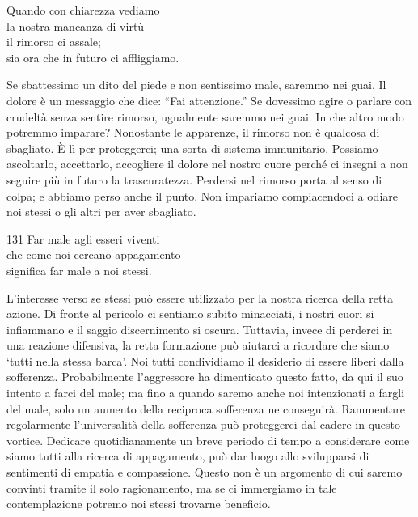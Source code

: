 \begin{dhpVerse}{15}
\label{dhp-15}
Quando con chiarezza vediamo\\
la nostra mancanza di virtù\\
il rimorso ci assale;\\
sia ora che in futuro ci affliggiamo.
\end{dhpVerse}

\begin{dhpRefl}
  Se sbattessimo un dito del piede e non sentissimo male, saremmo nei guai. Il
  dolore è un messaggio che dice: ``Fai attenzione.'' Se dovessimo agire o
  parlare con crudeltà senza sentire rimorso, ugualmente saremmo nei guai. In
  che altro modo potremmo imparare? Nonostante le apparenze, il rimorso non è
  qualcosa di sbagliato. È lì per proteggerci; una sorta di sistema immunitario.
  Possiamo ascoltarlo, accettarlo, accogliere il dolore nel nostro cuore perché
  ci insegni a non seguire più in futuro la trascuratezza. Perdersi nel rimorso
  porta al senso di colpa; e abbiamo perso anche il punto. Non impariamo
  compiacendoci a odiare noi stessi o gli altri per aver sbagliato.
\end{dhpRefl}


\begin{dhpVerse}{131}
\label{dhp-131}
Far male agli esseri viventi\\
che come noi cercano appagamento\\
significa far male a noi stessi.
\end{dhpVerse}

\begin{dhpRefl}
  L'interesse verso se stessi può essere utilizzato per la nostra ricerca della
  retta azione. Di fronte al pericolo ci sentiamo subito minacciati, i nostri
  cuori si infiammano e il saggio discernimento si oscura. Tuttavia, invece di
  perderci in una reazione difensiva, la retta formazione può aiutarci a
  ricordare che siamo `tutti nella stessa barca'. Noi tutti condividiamo il
  desiderio di essere liberi dalla sofferenza. Probabilmente l'aggressore ha
  dimenticato questo fatto, da qui il suo intento a farci del male; ma fino a
  quando saremo anche noi intenzionati a fargli del male, solo un aumento della
  reciproca sofferenza ne conseguirà. Rammentare regolarmente l'universalità
  della sofferenza può proteggerci dal cadere in questo vortice. Dedicare
  quotidianamente un breve periodo di tempo a considerare come siamo tutti alla
  ricerca di appagamento, può dar luogo allo svilupparsi di sentimenti di
  empatia e compassione. Questo non è un argomento di cui saremo convinti
  tramite il solo ragionamento, ma se ci immergiamo in tale contemplazione
  potremo noi stessi trovarne beneficio.
\end{dhpRefl}

